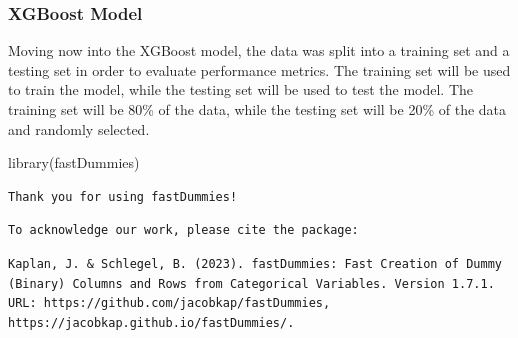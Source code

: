 \documentclass[
  super,
  preprint,
  3p]{elsarticle}
\newenvironment{Shaded}{\begin{snugshade}}{\end{snugshade}}
\newcommand{\FunctionTok}[1]{\textcolor[rgb]{0.28,0.35,0.67}{#1}}
\newcommand{\NormalTok}[1]{\textcolor[rgb]{0.00,0.23,0.31}{#1}}
\begin{document}
\hypertarget{xgboost-model}{%
\subsubsection{XGBoost Model}\label{xgboost-model}}

Moving now into the XGBoost model, the data was split into a training
set and a testing set in order to evaluate performance metrics. The
training set will be used to train the model, while the testing set will
be used to test the model. The training set will be 80\% of the data,
while the testing set will be 20\% of the data and randomly selected.

\begin{Shaded}
\begin{Highlighting}[]
\FunctionTok{library}\NormalTok{(fastDummies)}
\end{Highlighting}
\end{Shaded}

\begin{verbatim}
Thank you for using fastDummies!
\end{verbatim}

\begin{verbatim}
To acknowledge our work, please cite the package:
\end{verbatim}

\begin{verbatim}
Kaplan, J. & Schlegel, B. (2023). fastDummies: Fast Creation of Dummy (Binary) Columns and Rows from Categorical Variables. Version 1.7.1. URL: https://github.com/jacobkap/fastDummies, https://jacobkap.github.io/fastDummies/.
\end{verbatim}
\end{document}
